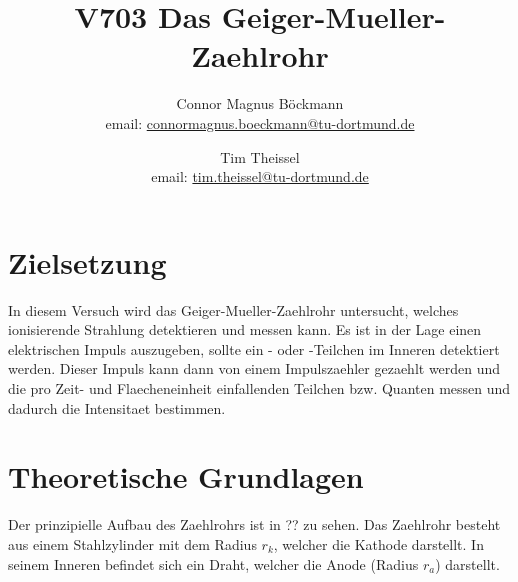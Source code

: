 \documentclass[titlepage=firstcover, captions=tableheading]{scrartcl}
\title{V703 Das Geiger-Mueller-Zaehlrohr}
\author{
Connor Magnus Böckmann \\ email: \href{mailto:connormagnus.boeckmann@tu-dortmund.de}{connormagnus.boeckmann@tu-dortmund.de}
\and Tim Theissel \\ email: \href{mailto:tim.theissel@tu-dortmund.de}{tim.theissel@tu-dortmund.de}}
\begin{document}
\maketitle
\newpage
\tableofcontents
\newpage
\section{Zielsetzung}
In diesem Versuch wird das Geiger-Mueller-Zaehlrohr untersucht, welches ionisierende Strahlung detektieren und messen kann. Es ist in der Lage einen elektrischen Impuls auszugeben, sollte ein \alpha- oder \beta-Teilchen im Inneren detektiert werden. Dieser Impuls kann dann von einem Impulszaehler gezaehlt werden und die pro Zeit- und Flaecheneinheit einfallenden Teilchen bzw. Quanten messen und dadurch die Intensitaet bestimmen. 
\section{Theoretische Grundlagen}
Der prinzipielle Aufbau des Zaehlrohrs ist in ?? zu sehen. Das Zaehlrohr besteht aus einem Stahlzylinder mit dem Radius $r_k$, welcher die Kathode darstellt. In seinem Inneren befindet sich ein Draht, welcher die Anode (Radius $r_a$) darstellt. 
\end{document}
